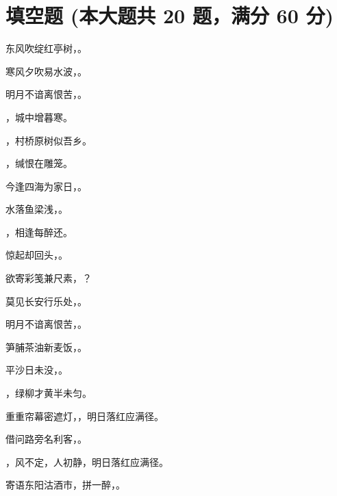 \documentclass[12pt, a4paper, addpoints, answers]{exam}
\begin{document}
\pagestyle{headandfoot}

\begin{center}
\end{center}
\vspace{5mm}

\normalsize
\vspace{5mm}

\section{\normalsize{填空题 (本大题共 20 题，满分 60 分)}}
\hspace{1.5cm}

\begin{questions}
\question[3] 东风吹绽红亭树，\fillin 。

\question[3] 寒风夕吹易水波，\fillin 。

\question[3] 明月不谙离恨苦，\fillin 。

\question[3] \fillin ，城中增暮寒。

\question[3] \fillin ，村桥原树似吾乡。

\question[3] \fillin ，缄恨在雕笼。

\question[3] 今逢四海为家日，\fillin 。

\question[3] 水落鱼梁浅，\fillin[天寒梦泽深] 。

\question[3] \fillin ，相逢每醉还。

\question[3] 惊起却回头，\fillin[有恨无人省] 。

\question[3] 欲寄彩笺兼尺素，\fillin ？

\question[3] 莫见长安行乐处，\fillin 。

\question[3] 明月不谙离恨苦，\fillin 。

\question[3] 笋脯茶油新麦饭，\fillin 。

\question[3] 平沙日未没，\fillin 。

\question[3] \fillin ，绿柳才黄半未匀。

\question[3] 重重帘幕密遮灯，\fillin ，明日落红应满径。

\question[3] 借问路旁名利客，\fillin 。

\question[3] \fillin ，风不定，人初静，明日落红应满径。

\question[3] 寄语东阳沽酒市，拼一醉，\fillin 。

\end{questions}
\end{document}
